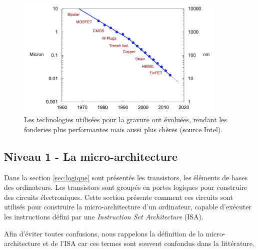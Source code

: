 \begin{figure}
    \center
    \includegraphics[width=10cm]{images/processeurs_porte_fondeurs.png}
    \caption{\label{processeurs_porte_fondeurs} Les technologies utilisées pour la gravure ont évoluées, rendant les fonderies plus performantes mais aussi plus chères (source Intel).}
\end{figure}












\subsection{Niveau 1 - La micro-architecture} \label{sec:micro}

Dans la section \autoref{sec:logique} sont présentés les transistors, les éléments de bases des ordinateurs. Les transistors sont groupés en portes logiques pour construire des circuits électroniques. Cette section présente comment ces circuits sont utilisés pour construire la micro-architecture d’un ordinateur, capable d’exécuter les instructions défini par une \textit{Instruction Set Architecture} (ISA).

Afin d'éviter toutes confusions, nous rappelons la définition de la micro-architecture et de l'ISA car ces termes sont souvent confondus dans la littérature. 

